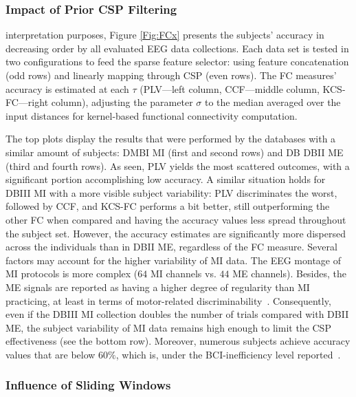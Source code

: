 \subsubsection{Impact of Prior CSP Filtering}

{ interpretation purposes, Figure \ref{Fig:FCx} presents the subjects' accuracy in decreasing order by all evaluated EEG data collections. Each data set is tested in two configurations to feed the sparse feature selector: using feature concatenation (odd rows) and linearly mapping through CSP (even rows). The FC measures' accuracy is estimated at each $\tau$ ({PLV}---left column, {CCF}---middle column, {KCS-FC}---right column), adjusting the parameter $\sigma$ to the median averaged over the input distances for kernel-based functional connectivity computation.} 

{The top plots display the results that were performed by the databases with a similar amount of subjects: DMBI MI (first and second rows) and DB DBII ME (third and fourth rows). As seen, PLV yields the most scattered outcomes, with a significant portion accomplishing low accuracy.} {A similar situation holds for DBIII MI with a more visible subject variability: PLV discriminates the worst, followed by CCF, and KCS-FC performs a bit better, still outperforming the other FC when compared and having the accuracy values less spread throughout the subject set}. However, the accuracy estimates are significantly more dispersed across the individuals than in DBII ME, regardless of the FC measure. Several factors may account for the higher variability of MI data. The EEG montage of MI protocols is more complex ($64$ MI channels vs. $44$ ME channels). Besides, the ME signals are reported as having a higher degree of regularity than MI practicing, at least in terms of motor-related discriminability~\cite{shamsi2020early}. Consequently, even if the DBIII MI collection doubles the number of trials compared with DBII ME, the subject variability of MI data remains high enough to limit the CSP effectiveness (see the bottom row). Moreover, numerous subjects achieve accuracy values that are below $60\%$, which is, under the BCI-inefficiency level reported~\cite{Sanelli2019}. 

\subsubsection{Influence of Sliding Windows}

